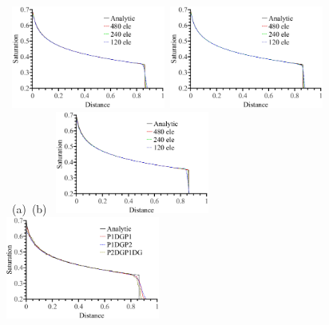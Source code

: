 \documentclass[preprint,authoryear,12pt]{elsarticle}
\begin{document}
\begin{figure}[h!]
  \begin{center}
    \vbox{\hbox{
        \hspace{0.25cm}\includegraphics[width=0.45\textwidth]{P1DGP1_M10.eps} 
        \hspace{0.25cm}\includegraphics[width=0.45\textwidth]{P1DGP2_M10.eps}}
      \hbox{
        \vspace{-0.cm}\hbox{\hspace{2.5cm}(a)} 
        \vspace{-0.cm}\hbox{\hspace{6.5cm}(b)}}
      \vspace{0.0cm}\hbox{
        \hspace{0.5cm}\includegraphics[width=0.45\textwidth]{P2DGP1DG_M10.eps}
        \hspace{0.5cm}\includegraphics[width=0.45\textwidth]{3D_three_elements.eps}}
}
\end{center}
\end{figure}
\end{document}
